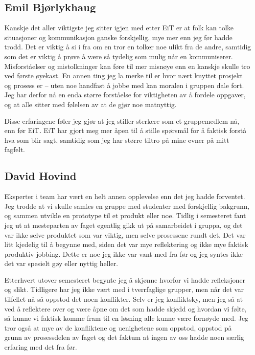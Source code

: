 \subsection*{Emil Bjørlykhaug}
Kanskje det aller viktigste jeg sitter igjen med etter EiT er at folk kan tolke situasjoner og kommunikasjon ganske forskjellig, mye mer enn jeg før hadde trodd. Det er viktig å si i fra om en tror en tolker noe ulikt fra de andre, samtidig som det er viktig å prøve å være så tydelig som mulig når en kommuniserer. Misforståelser og mistolkninger kan føre til mer misnøye enn en kanskje skulle tro ved første øyekast. En annen ting jeg la merke til er hvor nært knyttet prosjekt og prosess er – uten noe handfast å jobbe med kan moralen i gruppen dale fort. Jeg har derfor nå en enda større forståelse for viktigheten av å fordele oppgaver, og at alle sitter med følelsen av at de gjør noe matnyttig.

Disse erfaringene føler jeg gjør at jeg stiller sterkere som et gruppemedlem nå, enn før EiT. EiT har gjort meg mer åpen til å stille spørsmål for å faktisk forstå hva som blir sagt, samtidig som jeg har større tiltro på mine evner på mitt fagfelt. 

\subsection*{David Hovind}
Eksperter i team har vært en helt annen opplevelse enn det jeg hadde forventet. 
Jeg trodde at vi skulle samles en gruppe med studenter med forskjellig bakgrunn, og sammen utvikle en prototype til et produkt eller noe. 
Tidlig i semesteret fant jeg ut at mesteparten av faget egentlig gikk ut på samarbeidet i gruppa, og det var ikke selve produktet som var viktig, men selve prosessene rundt det. 
Det var litt kjedelig til å begynne med, siden det var mye reflektering og ikke mye faktisk produktiv jobbing. 
Dette er noe jeg ikke var vant med fra før og jeg syntes ikke det var spesielt gøy eller nyttig heller.

Etterhvert utover semesteret begynte jeg å skjønne hvorfor vi hadde refleksjoner og slikt. 
Tidligere har jeg ikke vært med i tverrfaglige grupper, men når det var tilfellet nå så oppstod det noen konflikter. 
Selv er jeg konfliktsky, men jeg så at ved å reflektere over og være åpne om det som hadde skjedd og hvordan vi følte, så kunne vi faktisk komme fram til en løsning alle kunne være fornøyde med. 
Jeg tror også at mye av de konfliktene og uenighetene som oppstod, oppstod på grunn av prosessdelen av faget og det faktum at ingen av oss hadde noen særlig erfaring med det fra før. 

